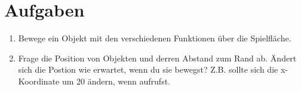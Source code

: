 \documentclass{\VorlagenPfad/coderdojokatext}
\begin{document}
\inputminted[firstline=62,lastline=68]{python}{../../../Beispiele/py2cd/objekte_positionieren.py}

\section{Aufgaben}
\begin{enumerate}
\item Bewege ein Objekt mit den verschiedenen Funktionen über die Spielfläche. 
\item Frage die Position von Objekten und derren Abstand zum Rand ab. Ändert sich die Postion wie erwartet, wenn du sie bewegst? Z.B. sollte sich die x-Koordinate um 20 ändern, wenn  aufrufst.
\end{enumerate}
\end{document}
